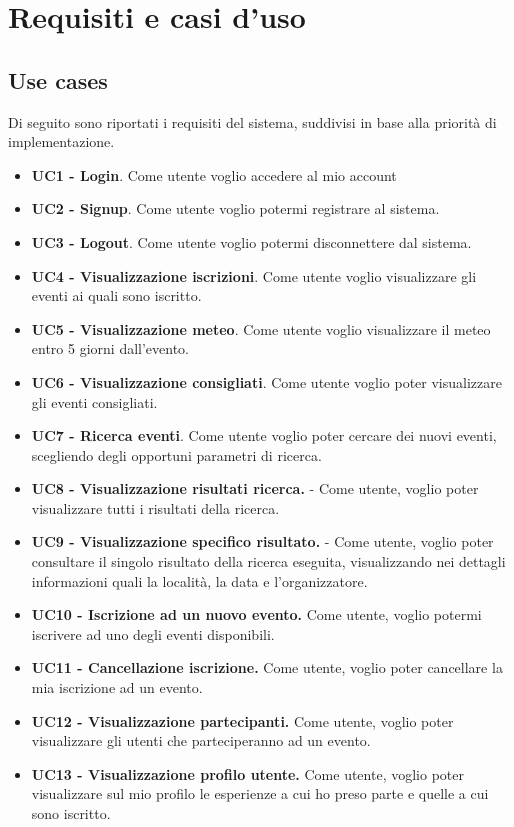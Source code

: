 \section{Requisiti e casi d'uso}

\subsection{Use cases}
Di seguito sono riportati i requisiti del sistema, suddivisi in base alla priorità di implementazione.

\begin{itemize}
    \item \textbf{UC1 - Login}. Come utente voglio accedere al mio account
    \item \textbf{UC2 - Signup}. Come utente voglio potermi registrare al sistema.
    \item \textbf{UC3 - Logout}. Come utente voglio potermi disconnettere dal sistema.
    \item \textbf{UC4 - Visualizzazione iscrizioni}. Come utente voglio visualizzare gli eventi ai quali sono iscritto.
    \item \textbf{UC5 - Visualizzazione meteo}. Come utente voglio visualizzare il meteo entro 5 giorni dall’evento.
    \item \textbf{UC6 - Visualizzazione consigliati}. Come utente voglio poter visualizzare gli eventi consigliati.
    \item \textbf{UC7 - Ricerca eventi}. Come utente voglio poter cercare dei nuovi eventi, scegliendo degli opportuni parametri di ricerca.
    \item \textbf{UC8 - Visualizzazione risultati ricerca.} - Come utente, voglio poter visualizzare tutti i risultati della ricerca.
    \item \textbf{UC9 - Visualizzazione specifico risultato.} - Come utente, voglio poter consultare il singolo risultato della ricerca eseguita, visualizzando nei dettagli informazioni quali la località, la data e l’organizzatore.
    \item \textbf{UC10 - Iscrizione ad un nuovo evento.} Come utente, voglio potermi iscrivere ad uno degli eventi disponibili.
    \item \textbf{UC11 - Cancellazione iscrizione.} Come utente, voglio poter cancellare la mia iscrizione ad un evento.
    \item \textbf{UC12 - Visualizzazione partecipanti.} Come utente, voglio poter visualizzare gli utenti che parteciperanno ad un evento.
    \item \textbf{UC13 - Visualizzazione profilo utente.} Come utente, voglio poter visualizzare sul mio profilo le esperienze a cui ho preso parte e quelle a cui sono iscritto.

\end{itemize}

